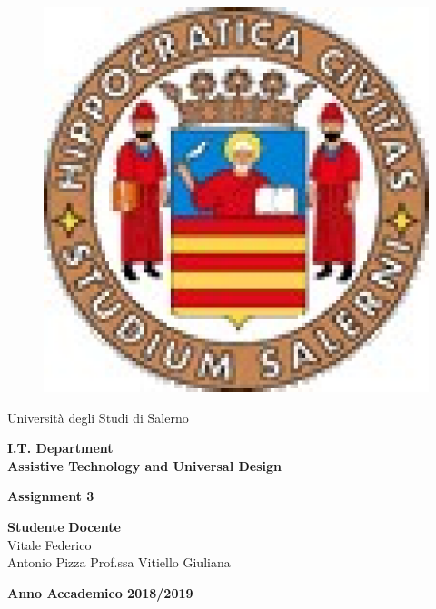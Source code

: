 \documentclass[11pt,oneside]{article}
\begin{document}
	
	\begin{titlepage}
		\begin{center}
			\hrulefill
			
			\begin{figure}[ht]\centering
				\includegraphics[width=3truecm]{Figure/logounisa.eps}
			\end{figure}
			
			
			{\Large Università degli Studi di Salerno}\\[0.2truecm]
			\hrulefill
			\vfill
		\end{center}
		
		
		
		
		\begin{center}
			
			\textbf{\Large I.T. Department}\\
			\vfill
			\textbf{\Large Assistive Technology and Universal Design}
		\end{center}
		\vfill  	
		\begin{center}
			\textbf{\Huge Assignment 3}\\[0.2truecm]
		\end{center}
		\vfill \vfill
		
		
		\vspace*{\fill}
		
		{\bf Studente } \hfill {\bf Docente}\ \ \\
		Vitale Federico \\ Antonio Pizza \hfill Prof.ssa Vitiello Giuliana\\
		
		\begin{center}
			\textbf{Anno Accademico 2018/2019}
		\end{center}
		
	\end{titlepage}
\end{document}
